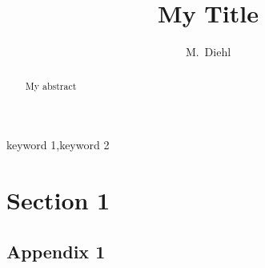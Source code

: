 \documentclass[3p,onecolumn]{elsarticle}
\begin{document}
\begin{frontmatter}

\title{My Title}

\author{M.~Diehl}

\address{Max-Planck-Institut f\"ur Eisenforschung, Max-Planck-Str.~1, 40237 D\"usseldorf, Germany}

\begin{abstract}
My abstract
\end{abstract}

\begin{keyword}
keyword 1\sep keyword 2
\end{keyword}

\end{frontmatter}

\tableofcontents


\section{Section 1}
\cite{Eisenlohr_etal2013}
\printbibliography

\begin{appendices}
\section{Appendix 1}
\end{appendices}
\end{document}
